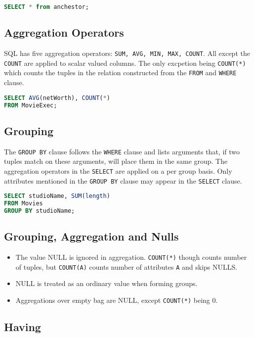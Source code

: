 \documentclass{sciposter}
\renewcommand{\t}[1]{\texttt{#1}}
\begin{document}
\begin{multicols}{3}
\begin{lstlisting}[language=SQL]
SELECT * from anchestor;
\end{lstlisting}

\subsection*{Aggregation Operators}

SQL has five aggregation operators: \texttt{SUM, AVG, MIN, MAX, COUNT}. All except the \t{COUNT} are applied to scalar valued columns. The only excpetion being \t{COUNT(*)} which counts the tuples in the relation constructed from the \t{FROM} and \t{WHERE} clause.

\begin{lstlisting}[language=SQL]
SELECT AVG(netWorth), COUNT(*) 
FROM MovieExec;
\end{lstlisting}


\subsection*{Grouping}
The \t{GROUP BY} clause follows the \t{WHERE} clause and lists arguments that, if two tuples match on these arguments, will place them in the same group. The aggregation operators in the \t{SELECT} are applied on a per group basis. Only attributes mentioned in the \t{GROUP BY} clause may appear in the \t{SELECT} clause.

\begin{lstlisting}[language=SQL]
SELECT studioName, SUM(length)
FROM Movies
GROUP BY studioName;
\end{lstlisting}

\subsection*{Grouping, Aggregation and Nulls}
\begin{itemize}
	\item The value NULL is ignored in aggregation. \t{COUNT(*)} though counts number of tuples, but \t{COUNT(A)} counts number of attributes \t{A} and skips NULLS.
	\item NULL is treated as an ordinary value when forming groups.
	\item Aggregations over empty bag are NULL, except \t{COUNT(*)} being 0.
\end{itemize}


\subsection*{Having}


\end{multicols}
\end{document}
